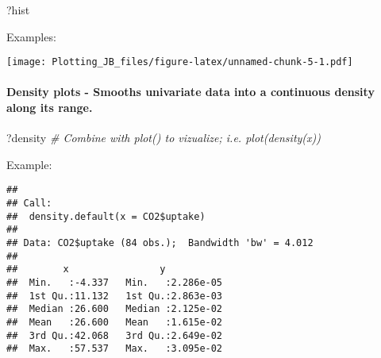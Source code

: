 \documentclass[]{article}
\newenvironment{Shaded}{\begin{snugshade}}{\end{snugshade}}
\newcommand{\CommentTok}[1]{\textcolor[rgb]{0.56,0.35,0.01}{\textit{#1}}}
\newcommand{\KeywordTok}[1]{\textcolor[rgb]{0.13,0.29,0.53}{\textbf{#1}}}
\newcommand{\NormalTok}[1]{#1}
\newcommand{\OperatorTok}[1]{\textcolor[rgb]{0.81,0.36,0.00}{\textbf{#1}}}
\let\oldparagraph\paragraph
\renewcommand{\paragraph}[1]{\oldparagraph{#1}\mbox{}}
\begin{document}
\begin{Shaded}
\begin{Highlighting}[]
\NormalTok{?hist}
\end{Highlighting}
\end{Shaded}

Examples:

\begin{Shaded}
\end{Shaded}

\texttt{[image: Plotting\_JB\_files/figure-latex/unnamed-chunk-5-1.pdf]}

\hypertarget{density-plots---smooths-univariate-data-into-a-continuous-density-along-its-range.}{%
\paragraph{Density plots - Smooths univariate data into a continuous
density along its
range.}\label{density-plots---smooths-univariate-data-into-a-continuous-density-along-its-range.}}

\begin{Shaded}
\begin{Highlighting}[]
\NormalTok{?density }\CommentTok{# Combine with plot() to vizualize; i.e. plot(density(x))}
\end{Highlighting}
\end{Shaded}

Example:

\begin{Shaded}
\end{Shaded}

\begin{verbatim}
## 
## Call:
##  density.default(x = CO2$uptake)
## 
## Data: CO2$uptake (84 obs.);  Bandwidth 'bw' = 4.012
## 
##        x                y            
##  Min.   :-4.337   Min.   :2.286e-05  
##  1st Qu.:11.132   1st Qu.:2.863e-03  
##  Median :26.600   Median :2.125e-02  
##  Mean   :26.600   Mean   :1.615e-02  
##  3rd Qu.:42.068   3rd Qu.:2.649e-02  
##  Max.   :57.537   Max.   :3.095e-02
\end{verbatim}

\begin{Shaded}
\end{Shaded}
\end{document}
